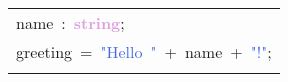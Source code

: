 \begin{tabular}[t]{l}
\noindent
\mbox{}name\ :\ \textbf{\textcolor{Plum}{string}}; \\
\mbox{}greeting\ =\ \textcolor{RoyalBlue}{"{}Hello\ "{}}\ +\ name\ +\ \textcolor{RoyalBlue}{"{}!"{}}; \\
\mbox{}
\end{tabular}
